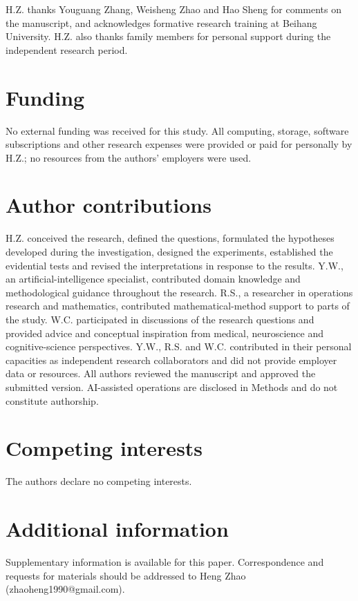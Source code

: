 \documentclass[12pt]{article}
\begin{document}
H.Z. thanks Youguang Zhang, Weisheng Zhao and Hao Sheng for comments on the manuscript, and acknowledges formative research training at Beihang University. H.Z. also thanks family members for personal support during the independent research period.

\section*{Funding}

No external funding was received for this study. All computing, storage, software subscriptions and other research expenses were provided or paid for personally by H.Z.; no resources from the authors' employers were used.

\section*{Author contributions}

H.Z. conceived the research, defined the questions, formulated the hypotheses developed during the investigation, designed the experiments, established the evidential tests and revised the interpretations in response to the results. Y.W., an artificial-intelligence specialist, contributed domain knowledge and methodological guidance throughout the research. R.S., a researcher in operations research and mathematics, contributed mathematical-method support to parts of the study. W.C. participated in discussions of the research questions and provided advice and conceptual inspiration from medical, neuroscience and cognitive-science perspectives. Y.W., R.S. and W.C. contributed in their personal capacities as independent research collaborators and did not provide employer data or resources. All authors reviewed the manuscript and approved the submitted version. AI-assisted operations are disclosed in Methods and do not constitute authorship.

\section*{Competing interests}

The authors declare no competing interests.

\section*{Additional information}

Supplementary information is available for this paper. Correspondence and requests for materials should be addressed to Heng Zhao (zhaoheng1990@gmail.com).
\end{document}
